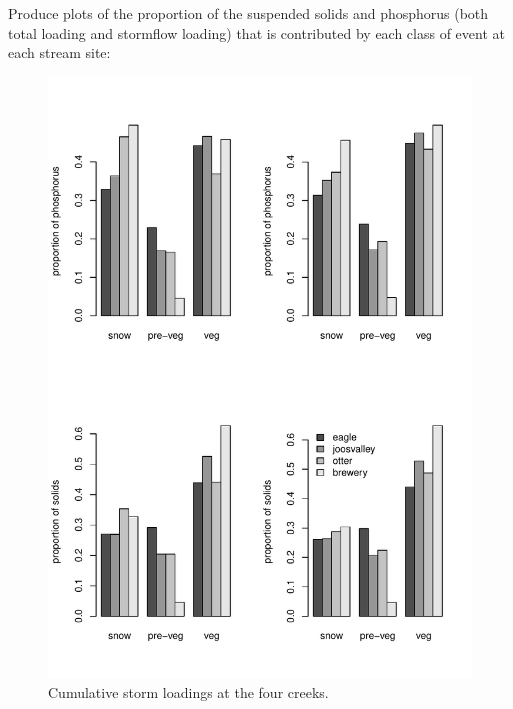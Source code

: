 \documentclass[12pt]{article}
\begin{document}
Produce plots of the proportion of the suspended solids and phosphorus (both total loading and stormflow loading) that is contributed by each class of event at each stream site:\\



\begin{figure}[h!]
    \begin{center}
\includegraphics{loadings-fig2}
    \end{center}
    \vspace{-10mm}
    \caption{Cumulative storm loadings at the four creeks.\label{bars}}
\end{figure}
\end{document}
